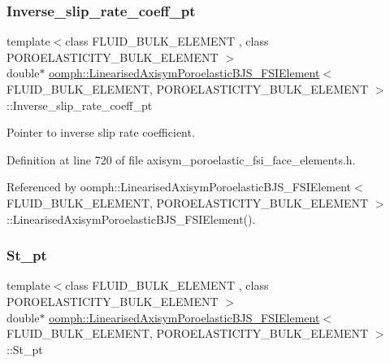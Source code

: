 \subsubsection{\texorpdfstring{Inverse\+\_\+slip\+\_\+rate\+\_\+coeff\+\_\+pt}{Inverse\_slip\_rate\_coeff\_pt}}
{\footnotesize\ttfamily template$<$class F\+L\+U\+I\+D\+\_\+\+B\+U\+L\+K\+\_\+\+E\+L\+E\+M\+E\+NT , class P\+O\+R\+O\+E\+L\+A\+S\+T\+I\+C\+I\+T\+Y\+\_\+\+B\+U\+L\+K\+\_\+\+E\+L\+E\+M\+E\+NT $>$ \\
double$\ast$ \hyperlink{classoomph_1_1LinearisedAxisymPoroelasticBJS__FSIElement}{oomph\+::\+Linearised\+Axisym\+Poroelastic\+B\+J\+S\+\_\+\+F\+S\+I\+Element}$<$ F\+L\+U\+I\+D\+\_\+\+B\+U\+L\+K\+\_\+\+E\+L\+E\+M\+E\+NT, P\+O\+R\+O\+E\+L\+A\+S\+T\+I\+C\+I\+T\+Y\+\_\+\+B\+U\+L\+K\+\_\+\+E\+L\+E\+M\+E\+NT $>$\+::Inverse\+\_\+slip\+\_\+rate\+\_\+coeff\+\_\+pt\hspace{0.3cm}{\ttfamily [private]}}



Pointer to inverse slip rate coefficient. 



Definition at line 720 of file axisym\+\_\+poroelastic\+\_\+fsi\+\_\+face\+\_\+elements.\+h.



Referenced by oomph\+::\+Linearised\+Axisym\+Poroelastic\+B\+J\+S\+\_\+\+F\+S\+I\+Element$<$ F\+L\+U\+I\+D\+\_\+\+B\+U\+L\+K\+\_\+\+E\+L\+E\+M\+E\+N\+T, P\+O\+R\+O\+E\+L\+A\+S\+T\+I\+C\+I\+T\+Y\+\_\+\+B\+U\+L\+K\+\_\+\+E\+L\+E\+M\+E\+N\+T $>$\+::\+Linearised\+Axisym\+Poroelastic\+B\+J\+S\+\_\+\+F\+S\+I\+Element().

\mbox{\label{classoomph_1_1LinearisedAxisymPoroelasticBJS__FSIElement_a3a754eeab45d9d14b81173fb33a57ec4}} 
\subsubsection{\texorpdfstring{St\+\_\+pt}{St\_pt}}
{\footnotesize\ttfamily template$<$class F\+L\+U\+I\+D\+\_\+\+B\+U\+L\+K\+\_\+\+E\+L\+E\+M\+E\+NT , class P\+O\+R\+O\+E\+L\+A\+S\+T\+I\+C\+I\+T\+Y\+\_\+\+B\+U\+L\+K\+\_\+\+E\+L\+E\+M\+E\+NT $>$ \\
double$\ast$ \hyperlink{classoomph_1_1LinearisedAxisymPoroelasticBJS__FSIElement}{oomph\+::\+Linearised\+Axisym\+Poroelastic\+B\+J\+S\+\_\+\+F\+S\+I\+Element}$<$ F\+L\+U\+I\+D\+\_\+\+B\+U\+L\+K\+\_\+\+E\+L\+E\+M\+E\+NT, P\+O\+R\+O\+E\+L\+A\+S\+T\+I\+C\+I\+T\+Y\+\_\+\+B\+U\+L\+K\+\_\+\+E\+L\+E\+M\+E\+NT $>$\+::St\+\_\+pt\hspace{0.3cm}{\ttfamily [private]}}



